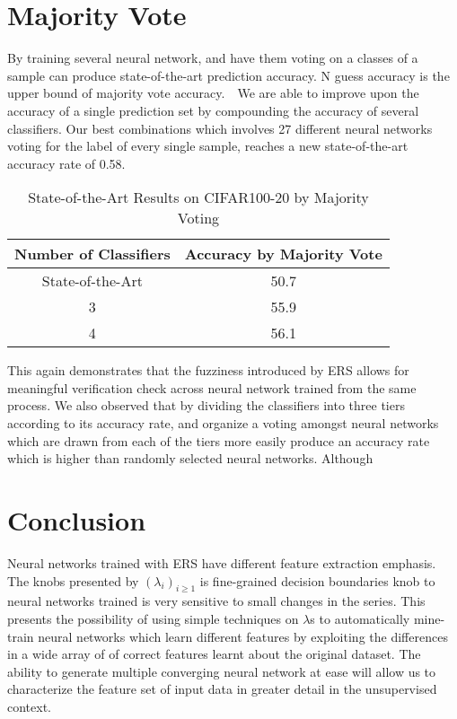 \documentclass[10pt,twocolumn,letterpaper]{article}
\begin{document}
\section{Majority Vote}
By training several neural network, and have them voting on a classes of a sample can produce state-of-the-art prediction accuracy. N guess accuracy is the upper bound of majority vote accuracy.　We are able to improve upon the accuracy of a single prediction set by compounding the accuracy of several classifiers.  Our best combinations which involves 27 different neural networks voting for the label of every single sample, reaches a new state-of-the-art accuracy rate of 0.58. 

\begin{table}[h]
\caption{State-of-the-Art Results on CIFAR100-20 by Majority Voting}
\begin{center}
\begin{tabular}{c|c}
    \hline
       Number of Classifiers & Accuracy by Majority Vote  \\  \hline
       State-of-the-Art & 50.7 \\ 
       3 & 55.9 \\
       4 & 56.1 \\

\end{tabular}
\end{center}
\label{tab:multicol}
\end{table}

This again demonstrates that the fuzziness introduced by ERS allows for meaningful verification check across neural network trained from the same process. We also observed that by dividing the classifiers into three tiers according to its accuracy rate, and organize a voting amongst neural networks which are drawn from each of the tiers more easily produce an accuracy rate which is higher than randomly selected neural networks. Although 

\section{Conclusion}
Neural networks trained with ERS have different feature extraction emphasis. The knobs presented by $(\lambda_{i})_{i \geq 1}$ is fine-grained decision boundaries knob to neural networks trained is very sensitive to small changes in the series.  This presents the possibility of using simple techniques on $\lambda$s to automatically mine-train neural networks which learn different features by exploiting the differences in a wide array of of correct features learnt about the original dataset. The ability to generate multiple converging neural network at ease will allow us to characterize the feature set of input data in greater detail in the unsupervised context.
{\small


}
\end{document}
